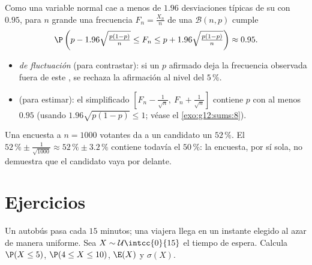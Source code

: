 \begin{method}\label{met:g12:contdist:fluctuation}
Como una variable normal cae a menos de $1.96$ desviaciones típicas de su
 con  $0.95$, para $n$ grande una frecuencia
$F_n = \frac{X_n}{n}$ de una  $\mathcal B(n,p)$ cumple
\[
\P\left(p - 1.96\sqrt{\tfrac{p(1-p)}{n}} \leq F_n \leq
p + 1.96\sqrt{\tfrac{p(1-p)}{n}}\right) \approx 0.95 .
\]
\begin{itemize}
  \item \emph{ de fluctuación} (para contrastar): si un $p$
        afirmado deja la frecuencia observada fuera de este , se
        rechaza la afirmación al nivel del $5\,\%$.
  \item \emph{} (para estimar): el 
        simplificado
        $\left[F_n - \frac{1}{\sqrt n},\ F_n + \frac{1}{\sqrt n}\right]$
        contiene $p$ con  al menos $0.95$ (usando
        $1.96\sqrt{p(1-p)} \leq 1$; véase el \cref{exo:g12:sums:8}).
\end{itemize}
\end{method}

\begin{example}\label{ex:g12:contdist:poll}
Una encuesta a $n = 1000$ votantes da a un candidato un $52\,\%$. El
$52\,\% \pm \frac{1}{\sqrt{1000}} \approx 52\,\% \pm 3.2\,\%$ contiene
todavía el $50\,\%$: la encuesta, por sí sola, no demuestra que el
candidato vaya por delante.
\end{example}

\section{Ejercicios}

\begin{exercise}[$\star$]\label{exo:g12:contdist:1}
Un autobús pasa cada $15$ minutos; una viajera llega en un instante
elegido al azar de manera uniforme. Sea $X \sim \mathcal U\intcc{0}{15}$ el
tiempo de espera. Calcula $\P(X \leq 5)$, $\P(4 \leq X \leq 10)$, $\E(X)$ y
$\sigma(X)$.
\end{exercise}

